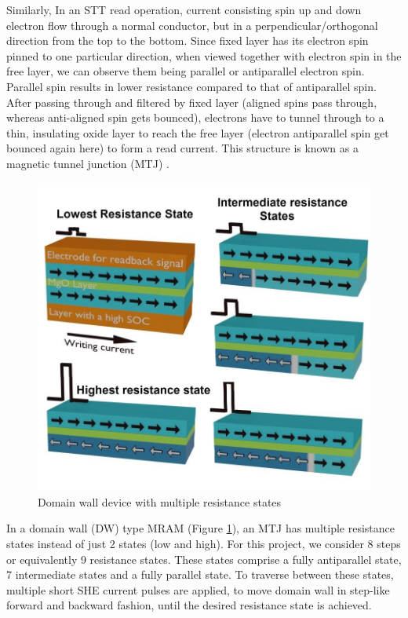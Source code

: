 Similarly, In an STT read operation, current consisting spin up and down electron flow through a normal conductor, but in a perpendicular/orthogonal direction from the top to the bottom. Since fixed layer has its electron spin pinned to one particular direction, when viewed together with electron spin in the free layer, we can observe them being parallel or antiparallel electron spin. Parallel spin results in lower resistance compared to that of antiparallel spin. After passing through and filtered by fixed layer (aligned spins pass through, whereas anti-aligned spin gets bounced), electrons have to tunnel through to a thin, insulating oxide layer to reach the free layer (electron antiparallel spin get bounced again here) to form a read current. This structure is known as a magnetic tunnel junction (MTJ) \cite{bhatti}.

\begin{figure}[H]
	\centering
	\includegraphics[scale=0.4]{dw.jpg}
	\caption{Domain wall device with multiple resistance states}
	\label{fig:dw}
\end{figure}

In a domain wall (DW) type MRAM (Figure \ref{fig:dw}), an MTJ has multiple resistance states instead of just 2 states (low and high). For this project, we consider 8 steps or equivalently 9 resistance states. These states comprise a fully antiparallel state, 7 intermediate states and a fully parallel state. To traverse between these states, multiple short SHE current pulses are applied, to move domain wall in step-like forward and backward fashion, until the desired resistance state is achieved. 

